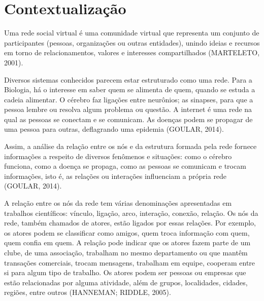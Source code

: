 









\frenchspacing 
\imprimircapa

\textual

\section*{Contextualização}


Uma rede social virtual é uma comunidade virtual que representa um conjunto de participantes (pessoas, organizações ou outras entidades), unindo ideias e recursos em torno de relacionamentos, valores e interesses compartilhados (MARTELETO, 2001).

Diversos sistemas conhecidos parecem estar estruturado como uma rede. Para a Biologia, há o interesse em saber quem se alimenta de quem, quando se estuda a cadeia alimentar. O cérebro faz ligações entre neurônios; as sinapses, para que a pessoa lembre ou resolva algum problema ou questão. A internet é uma rede na qual as pessoas se conectam e se comunicam. As doenças podem se propagar de uma pessoa para outras, deflagrando uma epidemia (GOULAR, 2014).

Assim, a análise da relação entre os nós e da estrutura formada pela rede fornece informações a respeito de diversos fenômenos e situações: como o cérebro funciona, como a doença se propaga, como as pessoas se comunicam e trocam informações, isto é, as relações ou interações influenciam a própria rede (GOULAR, 2014).

A relação entre os nós da rede tem várias denominações apresentadas em trabalhos científicos: vínculo, ligação, arco, interação, conexão, relação. Os nós da rede, também chamados de atores, estão ligados por essas relações. Por exemplo, os atores podem se classificar como amigos, quem troca informação com quem, quem confia em quem. A relação pode indicar que os atores fazem parte de um clube, de uma associação, trabalham no mesmo departamento ou que mantêm transações comerciais, trocam mensagens, trabalham em equipe, cooperam entre si para algum tipo de trabalho. Os atores podem ser pessoas ou empresas que estão relacionadas por alguma atividade, além de grupos, localidades, cidades, regiões, entre outros (HANNEMAN; RIDDLE, 2005).

